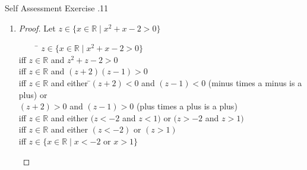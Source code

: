\documentclass[\main/notes.tex]{subfiles}
\begin{document}
\begin{exercise}{Self Assessment Exercise \thechapter.11}
\begin{enumerate}
\begin{proof}
\begin{tabbing}
								iff \> $w \in \mathbb{Z}^{+}$ and \=$(1 < w < 4)$\\
								\> \> ($\mathbb{Z}^{+}$ as all the numbers are positive)\\
								iff \> $w \in \mathbb{Z}^{+}$ and $w \in \{2, 3\}$\\
								iff \> $w \in \{x \in \mathbb{Z}^{+} \mid x \in \{2, 3\}\}$\\
								iff \> $w \in \{x \in \mathbb{Z}^{+} \mid x$ is a prime factor of $6\}$
							\end{tabbing}
						\end{proof}
					\item {}
						\begin{proof}
							Let $z \in \{x \in \mathbb{R} \mid x^{2} + x - 2 > 0\}$
							\begin{tabbing}
								$\qquad$ \= $z \in \{x \in \mathbb{R} \mid x^{2} + x - 2 > 0\}$\\
								iff \> $z \in \mathbb{R}$ and $z^{2} + z - 2 > 0$\\
								iff \> $z \in \mathbb{R}$ and $(z + 2)(z - 1) > 0$\\
								iff \> $z \in \mathbb{R}$ and either \=$(z + 2) < 0$ and $(z - 1) < 0$ (minus times a minus is a plus) or\\
								\> \> $(z + 2)> 0$ and $(z - 1) > 0$ (plus times a plus is a plus)\\
								iff \> $z \in \mathbb{R}$ and either $(z < -2$ and $z < 1)$ or $(z > -2$ and $z > 1)$\\
								iff \> $z \in \mathbb{R}$ and either $(z < -2)$ or $(z > 1)$\\
								iff \> $z \in \{x \in \mathbb{R} \mid x < -2$ or $x > 1\}$
							\end{tabbing}
						\end{proof}
				\end{enumerate}
			\end{exercise}
			\pagebreak
\end{document}
